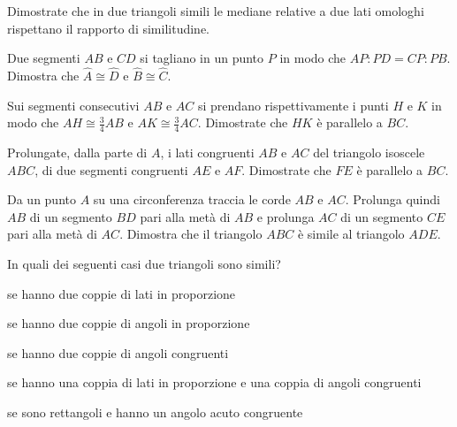 \begin{multicols}{2}
\begin{esercizio}
\label{ese:6.74}
Dimostrate che in due triangoli simili le mediane relative a due lati omologhi rispettano il rapporto di similitudine.
\end{esercizio}

\begin{esercizio}
\label{ese:6.75}
Due segmenti $AB$ e $CD$ si tagliano in un punto $P$ in modo che $AP:PD=CP:PB$. Dimostra che $\widehat{A}\cong \widehat{D}$ e $\widehat{B}\cong \widehat{C}$.
\end{esercizio}

\begin{esercizio}
\label{ese:6.76}
Sui segmenti consecutivi $AB$ e $AC$ si prendano rispettivamente i punti $H$ e $K$ in modo che $AH\cong \frac{3}{4}AB$ e $AK\cong \frac{3}{4}AC$. Dimostrate che $HK$ è parallelo a $BC$.
\end{esercizio}

\begin{esercizio}
\label{ese:6.77}
Prolungate, dalla parte di $A$, i lati congruenti $AB$ e $AC$ del triangolo isoscele $ABC$, di due segmenti congruenti $AE$ e $AF$. Dimostrate che $FE$ è parallelo a $BC$.
\end{esercizio}

\begin{esercizio}
\label{ese:6.78}
Da un punto $A$ su una circonferenza traccia le corde $AB$ e $AC$. Prolunga quindi $AB$ di un segmento $BD$ pari alla metà di $AB$ e prolunga $AC$ di un segmento $CE$ pari alla metà di $AC$. Dimostra che il triangolo $ABC$ è simile al triangolo $ADE$.
\end{esercizio}

\begin{esercizio}
\label{ese:6.79}
In quali dei seguenti casi due triangoli sono simili?
\begin{enumeratea}
\item se hanno due coppie di lati in proporzione\tab\hfill\boxV\quad\boxF
\item se hanno due coppie di angoli in proporzione\tab\hfill\boxV\quad\boxF
\item se hanno due coppie di angoli congruenti\tab\hfill\boxV\quad\boxF
\item se hanno una coppia di lati in proporzione e una coppia di angoli congruenti\tab\hfill\boxV\quad\boxF
\item se sono rettangoli e hanno un angolo acuto congruente\hfill\boxV\quad\boxF
\end{enumeratea}
\end{esercizio}


\end{multicols}
